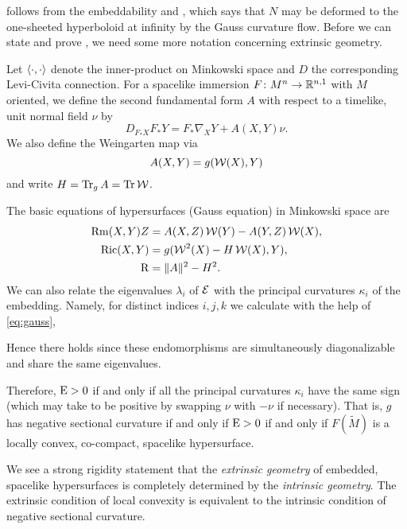 \documentclass[a4paper,12pt]{amsart}
\begin{document}
 follows from the embeddability  and \cite[Theorem 1.1]{MR3344442}, which says that \(N\) may be deformed to the one-sheeted hyperboloid at infinity by the Gauss curvature flow.
Before we can state and prove , we need some more notation concerning extrinsic geometry.

Let \(\left\langle \cdot,\cdot \right\rangle\) denote the inner-product on Minkowski space and \(D\) the corresponding Levi-Civita connection. For a spacelike immersion \(F\colon M^n \to \mathbb{R}^{n,1}\) with \(M\) oriented, we define the second fundamental form $A$ with respect to a timelike, unit normal field $\nu$ by
\[
D_{F_{\ast} X} F_{\ast} Y = F_{\ast} \nabla_X Y + A(X,Y)\nu.
\]
We also define the Weingarten map via
\[
A(X, Y) =  g(\operatorname{\mathcal{W}}(X), Y)
\]
and write $H = \operatorname{Tr}_{g}A = \operatorname{Tr} \operatorname{\mathcal{W}}$.

The basic equations of hypersurfaces (Gauss equation) in Minkowski space are
\begin{equation}
\label{eq:gauss}
\begin{split}
\operatorname{Rm}(X, Y) Z &= A(X, Z) \operatorname{\mathcal{W}}(Y) - A(Y, Z) \operatorname{\mathcal{W}}(X), \\
\operatorname{Ric}(X, Y) &= g(\operatorname{\mathcal{W}}^2(X) - H \operatorname{\mathcal{W}}(X), Y), \\
\operatorname{R} &= \|A\|^2 - H^2.
\end{split}
\end{equation}
We can also relate the eigenvalues $\lambda_{i}$ of $\operatorname{\mathcal{E}}$ with the principal curvatures $\kappa_{i}$ of the embedding. Namely, for distinct indices \(i,j,k\) we calculate with the help of \eqref{eq:gauss},

Hence there holds
since these endomorphisms are simultaneously diagonalizable and share the same eigenvalues.

Therefore, \(\operatorname{E} > 0\) if and only if all the principal curvatures \(\kappa_i\) have the same sign (which may take to be positive by swapping \(\nu\) with \(-\nu\) if necessary). That is, \(g\) has negative sectional curvature if and only if \(\operatorname{E} > 0\) if and only if \(F(\tilde{M})\) is a locally convex, co-compact, spacelike hypersurface.

\begin{rem}
We see a strong rigidity statement that the \emph{extrinsic geometry} of embedded, spacelike hypersurfaces is completely determined by the \emph{intrinsic geometry}. The extrinsic condition of local convexity is equivalent to the intrinsic condition of negative sectional curvature.
\end{rem}
\end{document}
